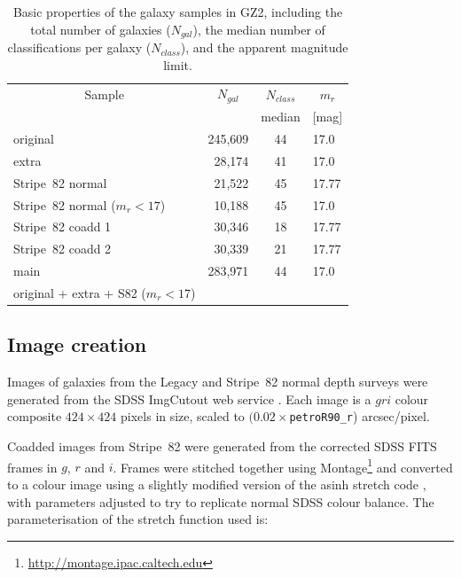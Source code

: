 \documentclass[useAMS,usenatbib]{mn2e}
\begin{document}
\begin{table}
 \begin{tabular}{@{}lrcl}
 \hline
\multicolumn{1}{c}{Sample} &
\multicolumn{1}{c}{$N_{gal}$} &
\multicolumn{1}{c}{$N_{class}$} &
\multicolumn{1}{c}{$m_r$} 
\\ 
\multicolumn{1}{c}{} &
\multicolumn{1}{c}{} &
\multicolumn{1}{c}{median} &
\multicolumn{1}{c}{[mag]} 
\\ 
\hline
\hline						
original                       & 245,609 & 44  & 17.0   \\     %
extra                          &  28,174 & 41  & 17.0   \\     %
Stripe~82 normal               &  21,522 & 45  & 17.77  \\     %
Stripe~82 normal ($m_r<17$)    &  10,188 & 45  & 17.0   \\     %
Stripe~82 coadd 1              &  30,346 & 18  & 17.77  \\     %
Stripe~82 coadd 2              &  30,339 & 21  & 17.77  \\     %
\hline
main                           & 283,971 & 44  & 17.0   \\     %
original + extra + S82 ($m_r<17$) & \\
\hline
 \end{tabular}
 \caption{Basic properties of the galaxy samples in GZ2, including the total number of galaxies ($N_{gal}$), the median number of classifications per galaxy ($N_{class}$), and the apparent magnitude limit. \label{tbl-sample}}
\end{table}

\subsection{Image creation}\label{ssec-imagecreation}

Images of galaxies from the Legacy and Stripe~82 normal depth surveys were generated from the SDSS ImgCutout web service \citep{nie04}. Each image is a $gri$ colour composite $424\times424$ pixels in size, scaled to $(0.02\times${\tt petroR90\_r}) arcsec/pixel.

Coadded images from Stripe~82 were generated from the corrected SDSS FITS frames in $g$, $r$ and $i$. Frames were stitched together using Montage\footnote{\url{http://montage.ipac.caltech.edu}} and converted to a colour image using a slightly modified version of the asinh stretch code \citep{lup04}, with parameters adjusted to try to replicate normal SDSS colour balance. The parameterisation of the stretch function used is:
\end{document}
